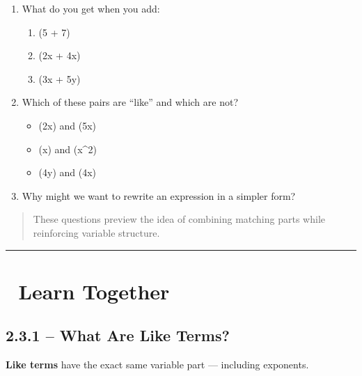 \documentclass[
  letterpaper,
  DIV=11,
  numbers=noendperiod]{scrreprt}
\providecommand{\tightlist}{%
  \setlength{\itemsep}{0pt}\setlength{\parskip}{0pt}}
\begin{document}
\begin{enumerate}
\def\labelenumi{\arabic{enumi}.}
\tightlist
\item
  What do you get when you add:

  \begin{enumerate}
  \def\labelenumii{\alph{enumii}.}
  \tightlist
  \item
    (5 + 7)\\
  \item
    (2x + 4x)\\
  \item
    (3x + 5y)
  \end{enumerate}
\item
  Which of these pairs are ``like'' and which are not?

  \begin{itemize}
  \tightlist
  \item
    (2x) and (5x)\\
  \item
    (x) and (x\^{}2)\\
  \item
    (4y) and (4x)
  \end{itemize}
\item
  Why might we want to rewrite an expression in a simpler form?
\end{enumerate}

\begin{quote}
These questions preview the idea of combining matching parts while
reinforcing variable structure.
\end{quote}

\begin{center}\rule{0.5\linewidth}{0.5pt}\end{center}

\section*{🧠 Learn Together}\label{learn-together-9}


\subsection*{2.3.1 -- What Are Like Terms?}\label{what-are-like-terms}

\textbf{Like terms} have the exact same variable part --- including
exponents.
\end{document}
